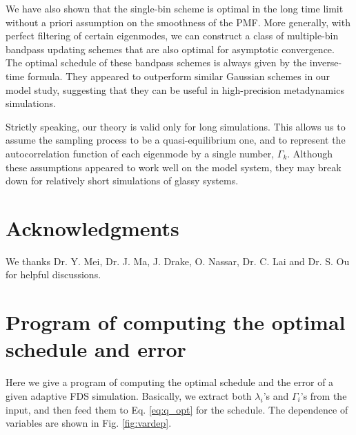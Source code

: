 \documentclass[reprint, floatfix]{revtex4-1}
\begin{document}
We have also shown that
the single-bin scheme is optimal
in the long time limit
without a priori assumption
on the smoothness of the PMF.
%
More generally, with perfect filtering
of certain eigenmodes, we can construct a
class of multiple-bin bandpass updating schemes
that are also optimal for asymptotic convergence.
%
The optimal schedule of these bandpass schemes
is always given by the inverse-time formula.
%
They appeared to outperform similar Gaussian schemes
in our model study,
suggesting that they can be useful
in high-precision metadynamics simulations.


Strictly speaking, our theory is valid
only for long simulations.
%
This allows us to assume the sampling process
to be a quasi-equilibrium one,
and to represent the autocorrelation function
of each eigenmode by a single number, $\Gamma_k$.
%
Although these assumptions appeared to work well
on the model system,
they may break down for relatively short simulations
of glassy systems.



\section{Acknowledgments}

We thanks
Dr. Y. Mei, Dr. J. Ma,
J. Drake, O. Nassar, Dr. C. Lai and Dr. S. Ou
for helpful discussions.


\appendix



\section{\label{sec:program}
Program of computing the optimal schedule and error
}


Here we give a program of computing
the optimal schedule and the error
of a given adaptive FDS simulation.
%
Basically, we extract
both $\lambda_i$'s and $\Gamma_i$'s
from the input,
and then feed them to Eq. \eqref{eq:q_opt}
for the schedule.
%
The dependence of variables are shown in Fig. \ref{fig:vardep}.
\end{document}
